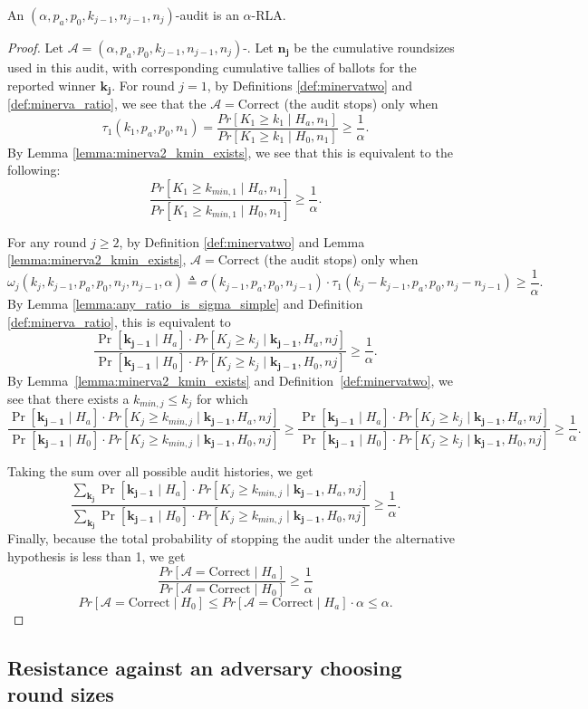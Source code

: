 \begin{theorem}
\label{thm:minerva2_is_rla_new}
An $(\alpha,p_a, p_0,k_{j-1},n_{j-1},n_j)$-\Providence audit is an
$\alpha$-RLA.
\end{theorem}
\begin{proof}
Let $\mathcal{A}=(\alpha,p_a, p_0,k_{j-1},n_{j-1},n_j)$-\Providence.
Let $\bm{n_j}$ be the cumulative roundsizes used in this
audit, with corresponding cumulative tallies of
ballots for the reported winner $\bm{k_j}$.
For round $j=1$, by Definitions \ref{def:minervatwo}
and \ref{def:minerva_ratio}, we see that
the $\mathcal{A}=\text{Correct}$ (the audit stops) only when
$$
\tau_1(k_{1},p_a,p_0,n_1)
=\frac{Pr[K_{1} \geq k_{1} \mid H_a, n_1]}{Pr[K_{1} \geq k_{1} \mid H_0, n_1]}
\ge \frac{1}{\alpha}.
$$
By Lemma \ref{lemma:minerva2_kmin_exists}, we see that this
is equivalent to the following:
$$
\frac{Pr[K_{1} \geq k_{min,1} \mid H_a, n_1]}{Pr[K_{1} \geq k_{min, 1} \mid H_0, n_1]}
\ge \frac{1}{\alpha}.
$$

For any round $j\ge 2$, by Definition \ref{def:minervatwo}
and Lemma \ref{lemma:minerva2_kmin_exists},
$\mathcal{A}=\text{Correct}$ (the audit stops) only when
$$
\omega_{j}(k_{j}, k_{j-1}, p_a, p_0, n_{j}, n_{j-1}, \alpha )\triangleq
\sigma(k_{j-1},p_a,p_0,n_{j-1})\cdot \tau_1(k_{j}-k_{j-1},p_a,p_0,n_j-n_{j-1})
\ge \frac{1}{\alpha}.
$$
By Lemma \ref{lemma:any_ratio_is_sigma_simple}
and Definition \ref{def:minerva_ratio}, this is equivalent to
$$
\frac{\Pr[\bm{k_{j-1}} \mid H_a]\cdot Pr[K_{j} \ge k_{j} \mid \bm{k_{j-1}}, H_a, n{j}]}{\Pr[\bm{k_{j-1}} \mid H_0]\cdot Pr[K_{j} \ge k_{j} \mid \bm{k_{j-1}}, H_0, n{j}]}\ge \frac{1}{\alpha}.
$$
By Lemma~\ref{lemma:minerva2_kmin_exists} and Definition~\ref{def:minervatwo},
we see that there exists a $k_{min, j}\le k_j$ for which
$$
\frac{\Pr[\bm{k_{j-1}} \mid H_a]\cdot Pr[K_{j} \ge k_{min, j} \mid \bm{k_{j-1}}, H_a, n{j}]}{\Pr[\bm{k_{j-1}} \mid H_0]\cdot Pr[K_{j} \ge k_{min, j} \mid \bm{k_{j-1}}, H_0, n{j}]} \ge
\frac{\Pr[\bm{k_{j-1}} \mid H_a]\cdot Pr[K_{j} \ge k_{j} \mid \bm{k_{j-1}}, H_a, n{j}]}{\Pr[\bm{k_{j-1}} \mid H_0]\cdot Pr[K_{j} \ge k_{j} \mid \bm{k_{j-1}}, H_0, n{j}]}\ge \frac{1}{\alpha}.
$$

Taking the sum over all possible audit histories, we get
$$
\frac{\sum_{\bm{k_j}}\Pr[\bm{k_{j-1}} \mid H_a]\cdot Pr[K_{j} \ge k_{min, j} \mid \bm{k_{j-1}}, H_a, n{j}]}{\sum_{\bm{k_j}}\Pr[\bm{k_{j-1}} \mid H_0]\cdot Pr[K_{j} \ge k_{min, j} \mid \bm{k_{j-1}}, H_0, n{j}]}\ge \frac{1}{\alpha}.
$$
Finally, because the total probability of stopping the audit under
the alternative hypothesis is less than 1, we get
$$
\frac{Pr[\mathcal{A}=\text{Correct} \mid H_a]}{Pr[\mathcal{A}=\text{Correct} \mid H_0]}\ge \frac{1}{\alpha}
$$
$$
Pr[\mathcal{A}=\text{Correct} \mid H_0]
\le
Pr[\mathcal{A}=\text{Correct} \mid H_a] \cdot \alpha
\le
\alpha.
$$
\end{proof}

\subsection{Resistance against an adversary choosing round sizes}
